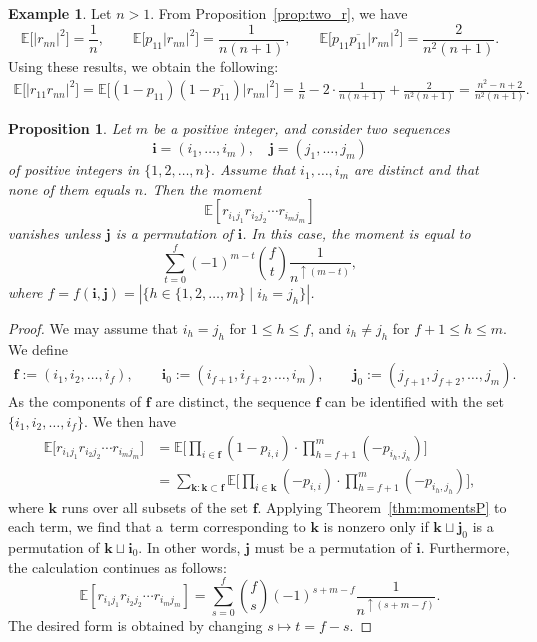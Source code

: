 \documentclass[pdftex]{sigma}
\numberwithin{equation}{section}
\newtheorem{Proposition}[Theorem]{Proposition}
\theoremstyle{definition}
\newtheorem{Example}[Theorem]{Example}
\begin{document}
\begin{Example} \label{example:two_r}
 Let $n>1$. From Proposition~\ref{prop:two_r}, we have
 \[
 \mathbb{E}\bigl[|r_{nn}|^2\bigr] = \frac{1}{n}, \qquad
 \mathbb{E}\bigl[p_{11} |r_{nn}|^2\bigr] =\frac{1}{n(n+1)}, \qquad
 \mathbb{E}\bigl[p_{11} \overline{p_{11}}|r_{nn}|^2\bigr] = \frac{2}{n^2(n+1)}.
 \]
 Using these results, we obtain the following:
 \begin{align*}
 \mathbb{E}\bigl[|r_{11} r_{nn}|^2\bigr] = \mathbb{E}\bigl[(1-p_{11})(1-\overline{p_{11}}) |r_{nn}|^2\bigr]
 = \frac{1}{n} -2 \cdot \frac{1}{n(n+1)}+ \frac{2}{n^2(n+1)} = \frac{n^2-n+2}{n^2(n+1)}.
 \end{align*}
\end{Example}


\begin{Proposition}
Let $m$ be a positive integer, and consider two sequences
\[
\bm{i}=(i_1,\dots, i_m), \quad \bm{j} =(j_1,\dots, j_m)%
\]
 of positive integers in $\{1,2,\dots,n\}.$
Assume that $i_1,\dots,i_m$ are distinct
and that none of them equals $n$.
Then the moment
\[
\mathbb{E} \left[ r_{i_1 j_1} r_{i_2 j_2} \cdots r_{i_m j_m} \right]
\]
vanishes unless $\bm{j}$ is a permutation of $\bm{i}$.
In this case, the moment is equal to
\begin{equation} \label{eq:ascention_proto}
\sum_{t=0}^f (-1)^{m-t} \binom{f}{t} \frac{1}{n^{\uparrow (m-t)}},
\end{equation}
where $f=f(\bm{i},\bm{j})=|\{h \in \{1,2,\dots,m\} \mid i_h=j_h \}|$.
\end{Proposition}

\begin{proof}
We may assume that $i_h =j_h$ for $1 \le h \le f$, and $i_h \not=j_h$ for $f+1 \le h \le m$.
We define
\begin{gather*}
\bm{f}:= (i_1,i_2, \dots, i_f), \qquad
\bm{i}_0:= (i_{f+1}, i_{f+2}, \dots, i_{m}), \qquad
\bm{j}_0:= (j_{f+1}, j_{f+2}, \dots, j_{m}).
\end{gather*}
As the components of $\bm{f}$ are distinct,
the sequence $\bm{f}$ can be identified with the set $\{i_1,i_2,\dots,i_f\}$.
We then have
\begin{align*}
 \mathbb{E} \Biggl[ r_{i_1 j_1} r_{i_2 j_2} \cdots r_{i_m j_m} \Biggr]
 &= \mathbb{E} \Biggl[\prod_{i \in \bm{f}} (1- p_{i, i}) \cdot \prod_{h=f+1}^m (-p_{i_h, j_h}) \Biggr] \\
 &= \sum_{\bm{k}: \bm{k} \subset \bm{f}} \mathbb{E} \Biggl[\prod_{i \in \bm{k}} (-p_{i,i}) \cdot\prod_{h=f+1}^m (-p_{i_h,j_h}) \Biggr],
\end{align*}
where $\bm{k}$ runs over all subsets of the set $\bm{f}$.
Applying Theorem~\ref{thm:momentsP} to each term,
we find that a~term corresponding to $\bm{k}$ is nonzero only if $\bm{k} \sqcup \bm{j}_0$ is a permutation of $\bm{k} \sqcup \bm{i}_0$. In other words, $\bm{j}$ must be a permutation of $\bm{i}$.
Furthermore, the calculation continues as follows:
\[
 \mathbb{E} \left[ r_{i_1 j_1} r_{i_2 j_2} \cdots r_{i_m j_m} \right]
 = \sum_{s=0}^f \binom{f}{s} (-1)^{s+m-f}
 \frac{1}{n^{\uparrow (s+m-f)}}.
\]
The desired form is obtained by changing $s \mapsto t =f-s$.
\end{proof}
\end{document}
